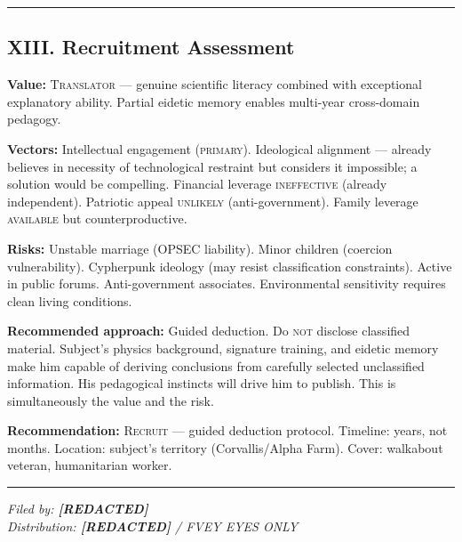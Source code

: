 \vspace{1cm}\hrule\vspace{1cm}

\subsection*{XIII. Recruitment Assessment}
\label{interlude:recruitment-assessment}

\textbf{Value:} \textsc{Translator} --- genuine scientific literacy combined with exceptional explanatory ability. Partial eidetic memory enables multi-year cross-domain pedagogy.

\textbf{Vectors:} Intellectual engagement (\textsc{primary}). Ideological alignment --- already believes in necessity of technological restraint but considers it impossible; a solution would be compelling. Financial leverage \textsc{ineffective} (already independent). Patriotic appeal \textsc{unlikely} (anti-government). Family leverage \textsc{available} but counterproductive.

\textbf{Risks:} Unstable marriage (OPSEC liability). Minor children (coercion vulnerability). Cypherpunk ideology (may resist classification constraints). Active in public forums. Anti-government associates. Environmental sensitivity requires clean living conditions.

\textbf{Recommended approach:} Guided deduction. Do \textsc{not} disclose classified material. Subject's physics background, signature training, and eidetic memory make him capable of deriving conclusions from carefully selected unclassified information. His pedagogical instincts will drive him to publish. This is simultaneously the value and the risk.

\textbf{Recommendation:} \textsc{Recruit} --- guided deduction protocol. Timeline: years, not months. Location: subject's territory (Corvallis/Alpha Farm). Cover: walkabout veteran, humanitarian worker.

\vspace{1cm}\hrule\vspace{0.5cm}

\begin{flushright}\small\textit{%
Filed by: \textbf{[REDACTED]}\\
Distribution: \textbf{[REDACTED]} / FVEY EYES ONLY%
}\end{flushright}

\chapterreturn
